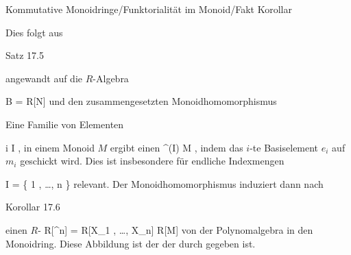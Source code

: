 {Kommutative Monoidringe/Funktorialität im Monoid/Fakt}
{Korollar}
{}
{



\faktsituation {}
\faktzusatz {}
\faktzusatz {}





}
{





Dies folgt aus

Satz 17.5

angewandt auf die
$R$-Algebra

\mavergleichskette
{\vergleichskette
{ B
}
{ = }{ R[N]
}
{  }{
}
{    }{
}
{   }{
}
}
{}{}{}
und den zusammengesetzten Monoidhomomorphismus




}




{}
{





Eine Familie von Elementen

 {}
 {i \in I} {}
 {} {} {} {,}
in einem Monoid $M$ ergibt einen
\maabb {} { \N^{(I)} } { M
} {,}
indem das $i$-te Basiselement $e_i$ auf $m_i$ geschickt wird. Dies ist insbesondere für endliche Indexmengen

\mavergleichskette
{\vergleichskette
{ I
}
{ = }{ \{ 1 , \ldots , n \}
}
{  }{
}
{    }{
}
{   }{
}
}
{}{}{}
relevant. Der Monoidhomomorphismus induziert dann nach

Korollar 17.6

einen
$R$-
\maabb {} { R[\N^n] = R[X_1 , \ldots ,  X_n] } { R[M]
} {}
von der Polynomalgebra in den Monoidring. Diese Abbildung ist der
der durch
 gegeben ist.





}


